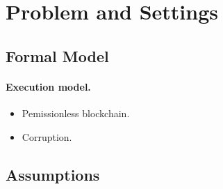 \section{Problem and Settings}

\subsection{Formal Model}

\paragraph{Execution model.} 

\begin{itemize}

\item Pemissionless blockchain.

\item Corruption. 

\end{itemize}



\subsection{Assumptions}
